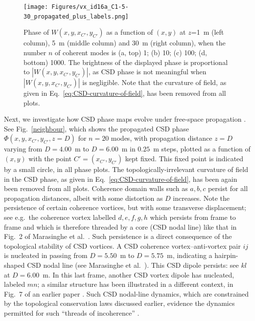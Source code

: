 \documentclass[%
 reprint,
 amsmath,amssymb,
 aps,
]{revtex4-1}
\begin{document}
\begin{figure}
\texttt{[image: Figures/vx\_id16a\_C1-5-30\_propagated\_plus\_labels.png]}
\caption{Phase of $W(x,y,x_{C'},y_{C'})$ as a function of $(x,y)$ at $z$=1~m (left column), 5~m (middle column) and 30~m (right column), when the number $n$ of coherent modes is (a, top) 1; (b) 10; (c) 100; (d, bottom) 1000. The brightness of the displayed phase is proportional to $|W(x,y,x_{C'},y_{C'})|$, as CSD phase is not meaningful when $|W(x,y,x_{C'},y_{C'})|$ is negligible. Note that the curvature of field, as given in Eq.~\ref{eq:CSD-curvature-of-field}, has been removed from all plots.}
\label{pointC_propagated}%
\end{figure}

Next, we investigate how CSD phase maps evolve under free-space propagation \cite{TopologicalReactionsCohVortices,Marasinghe2010,Marasinghe2011}.  %
See Fig.~\ref{neighbour}, which shows the propagated CSD phase $\Phi(x,y,x_{C'},y_{C'},z=D)$ for $n=20$ modes, with propagation distance $z=D$ varying from $D=4.00$~m to $D=6.00$~m in $0.25$~m steps, plotted as a function of $(x,y)$ with the point $C'=(x_{C'},y_{C'})$ kept fixed. This fixed point is indicated by a small circle, in all phase plots. The topologically-irrelevant curvature of field in the CSD phase, as given in Eq.~\ref{eq:CSD-curvature-of-field}, has been again been removed from all plots. Coherence domain walls such as $a,b,c$ persist for all propagation distances, albeit with some distortion as $D$ increases.  Note the persistence of certain coherence vortices, but with some transverse displacement; see e.g.~the coherence vortex labelled $d,e,f,g,h$ which persists from frame to frame and which is therefore threaded by a core (CSD nodal line) like that in Fig.~2 of Marasinghe et al.~\cite{Marasinghe2010}. Such persistence is a direct consequence of the topological stability of CSD vortices.  A CSD coherence vortex--anti-vortex pair $ij$ is nucleated in passing from $D=5.50$~m to $D=5.75$~m, indicating a hairpin-shaped CSD nodal line (see Marasinghe et al.~\cite{Marasinghe2010,Marasinghe2011}).   This CSD dipole persists: see $kl$ at $D=6.00$~m.  In this last frame, another CSD vortex dipole has nucleated, labeled $mn$; a similar structure has been illustrated in a different context, in Fig.~7 of an earlier paper \cite{Marasinghe2010}.  Such CSD nodal-line dynamics, which are constrained by the topological conservation laws discussed earlier, evidence the dynamics permitted for such ``threads of incoherence'' \cite{TopologicalReactionsCohVortices, Marasinghe2011}.
\end{document}
